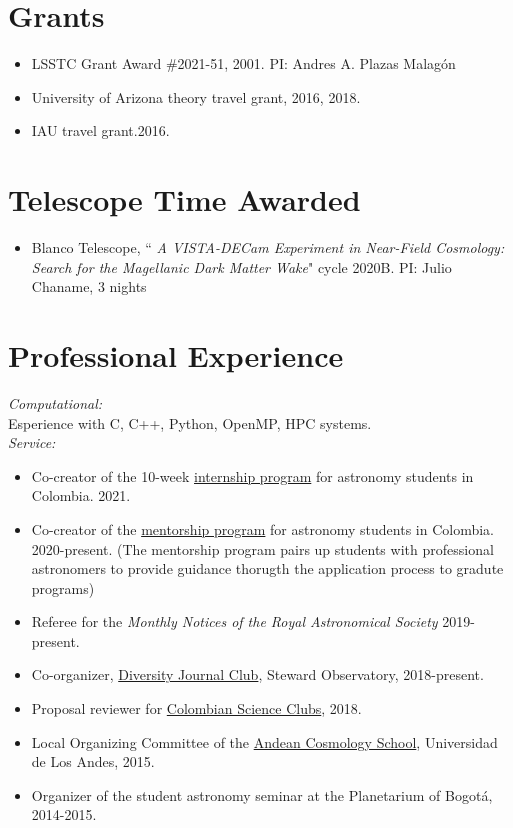 \documentclass[UTF8]{article}
\begin{document}
\section*{Grants}
\begin{itemize}
\setlength\itemsep{0.0em}
\renewcommand\labelitemi{$\cdot$}
\item LSSTC Grant Award \#2021-51, 2001. PI: Andres A. Plazas Malag\'on
\item University of Arizona theory travel grant, 2016, 2018. 
\item IAU travel grant.2016.
\end{itemize}

\section*{Telescope Time Awarded}
\begin{itemize}
  \setlength\itemsep{0.0em}
  \renewcommand\labelitemi{$\cdot$}
\item Blanco Telescope, ``\textit{ A VISTA-DECam Experiment in Near-Field
  Cosmology: Search for the Magellanic Dark Matter Wake}" cycle 2020B. PI: Julio Chaname, 3 nights 
\end{itemize}

\section*{Professional Experience}
\textit{Computational:}\\
Esperience with C, C++, Python, OpenMP, HPC systems.\\

\textit{Service:} 
\begin{itemize}
  \setlength\itemsep{0.0em}
  \renewcommand\labelitemi{$\cdot$}
\item Co-creator of the 10-week  \href{https://recastronomia.github.io/internship/}{internship program} for astronomy students in Colombia. 2021.

\item Co-creator of the \href{https://recastronomia.github.io/mentores/}{mentorship program} for astronomy students in Colombia. 2020-present.
  (The mentorship program pairs up students with professional astronomers to
  provide guidance thorugth the application process to gradute programs)

\item Referee for the \textit{Monthly Notices of the Royal Astronomical Society} 2019-present.
\item Co-organizer,  \href{https://www.as.arizona.edu/diversity_coffee/}{Diversity Journal Club},
  Steward Observatory, 2018-present.
\item Proposal reviewer for \href{https://clubesdeciencia.co/}{Colombian Science Clubs}, 2018.
\item Local Organizing Committee of the \href{http://forero.github.io/AndeanCosmologySchool/}{Andean Cosmology School}, Universidad de Los Andes, 2015.
\item Organizer of the student astronomy seminar at the Planetarium of Bogot\'a, 2014-2015.
\end{itemize}
\end{document}
